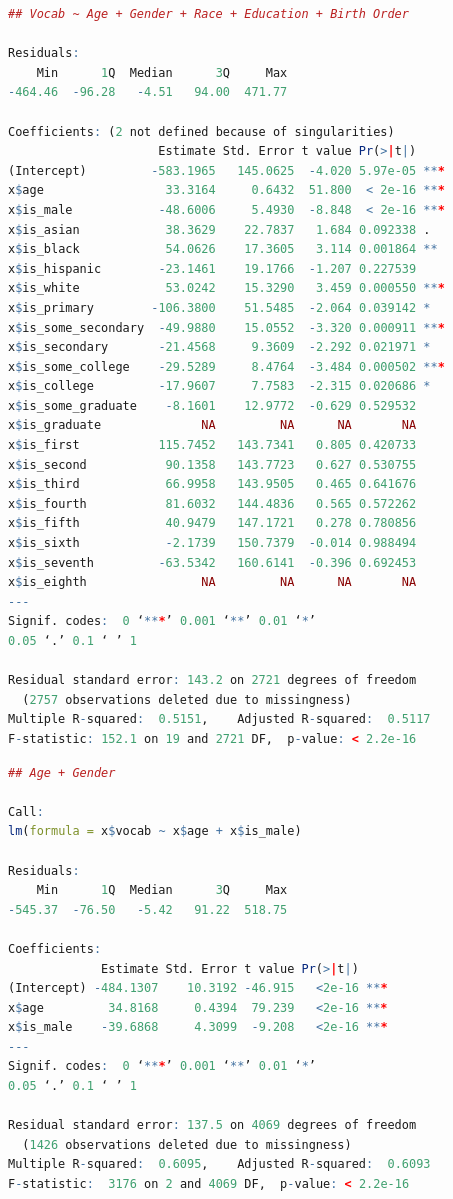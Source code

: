 \documentclass[12pt]{elsarticle}
\begin{document}
\begin{lstlisting}[language=R]
## Vocab ~ Age + Gender + Race + Education + Birth Order

Residuals:
    Min      1Q  Median      3Q     Max
-464.46  -96.28   -4.51   94.00  471.77

Coefficients: (2 not defined because of singularities)
                     Estimate Std. Error t value Pr(>|t|)
(Intercept)         -583.1965   145.0625  -4.020 5.97e-05 ***
x$age                 33.3164     0.6432  51.800  < 2e-16 ***
x$is_male            -48.6006     5.4930  -8.848  < 2e-16 ***
x$is_asian            38.3629    22.7837   1.684 0.092338 .
x$is_black            54.0626    17.3605   3.114 0.001864 **
x$is_hispanic        -23.1461    19.1766  -1.207 0.227539
x$is_white            53.0242    15.3290   3.459 0.000550 ***
x$is_primary        -106.3800    51.5485  -2.064 0.039142 *
x$is_some_secondary  -49.9880    15.0552  -3.320 0.000911 ***
x$is_secondary       -21.4568     9.3609  -2.292 0.021971 *
x$is_some_college    -29.5289     8.4764  -3.484 0.000502 ***
x$is_college         -17.9607     7.7583  -2.315 0.020686 *
x$is_some_graduate    -8.1601    12.9772  -0.629 0.529532
x$is_graduate              NA         NA      NA       NA
x$is_first           115.7452   143.7341   0.805 0.420733
x$is_second           90.1358   143.7723   0.627 0.530755
x$is_third            66.9958   143.9505   0.465 0.641676
x$is_fourth           81.6032   144.4836   0.565 0.572262
x$is_fifth            40.9479   147.1721   0.278 0.780856
x$is_sixth            -2.1739   150.7379  -0.014 0.988494
x$is_seventh         -63.5342   160.6141  -0.396 0.692453
x$is_eighth                NA         NA      NA       NA
---
Signif. codes:  0 ‘***’ 0.001 ‘**’ 0.01 ‘*’
0.05 ‘.’ 0.1 ‘ ’ 1

Residual standard error: 143.2 on 2721 degrees of freedom
  (2757 observations deleted due to missingness)
Multiple R-squared:  0.5151,	Adjusted R-squared:  0.5117
F-statistic: 152.1 on 19 and 2721 DF,  p-value: < 2.2e-16
\end{lstlisting}

\begin{lstlisting}[language=R]
## Age + Gender

Call:
lm(formula = x$vocab ~ x$age + x$is_male)

Residuals:
    Min      1Q  Median      3Q     Max
-545.37  -76.50   -5.42   91.22  518.75

Coefficients:
             Estimate Std. Error t value Pr(>|t|)
(Intercept) -484.1307    10.3192 -46.915   <2e-16 ***
x$age         34.8168     0.4394  79.239   <2e-16 ***
x$is_male    -39.6868     4.3099  -9.208   <2e-16 ***
---
Signif. codes:  0 ‘***’ 0.001 ‘**’ 0.01 ‘*’
0.05 ‘.’ 0.1 ‘ ’ 1

Residual standard error: 137.5 on 4069 degrees of freedom
  (1426 observations deleted due to missingness)
Multiple R-squared:  0.6095,	Adjusted R-squared:  0.6093
F-statistic:  3176 on 2 and 4069 DF,  p-value: < 2.2e-16
\end{lstlisting}
\end{document}
